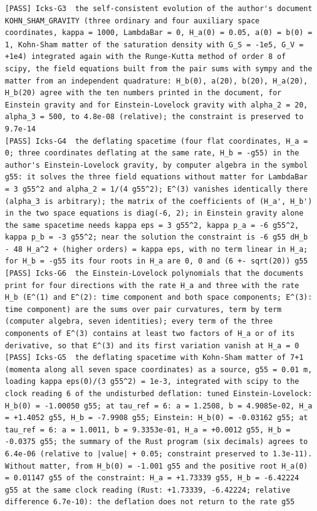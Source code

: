 \documentclass[
  10pt,
]{article}
\begin{document}
\begin{verbatim}
[PASS] Icks-G3  the self-consistent evolution of the author's document KOHN_SHAM_GRAVITY (three ordinary and four auxiliary space coordinates, kappa = 1000, LambdaBar = 0, H_a(0) = 0.05, a(0) = b(0) = 1, Kohn-Sham matter of the saturation density with G_S = -1e5, G_V = +1e4) integrated again with the Runge-Kutta method of order 8 of scipy, the field equations built from the pair sums with sympy and the matter from an independent quadrature: H_b(0), a(20), b(20), H_a(20), H_b(20) agree with the ten numbers printed in the document, for Einstein gravity and for Einstein-Lovelock gravity with alpha_2 = 20, alpha_3 = 500, to 4.8e-08 (relative); the constraint is preserved to 9.7e-14
[PASS] Icks-G4  the deflating spacetime (four flat coordinates, H_a = 0; three coordinates deflating at the same rate, H_b = -g55) in the author's Einstein-Lovelock gravity, by computer algebra in the symbol g55: it solves the three field equations without matter for LambdaBar = 3 g55^2 and alpha_2 = 1/(4 g55^2); E^(3) vanishes identically there (alpha_3 is arbitrary); the matrix of the coefficients of (H_a', H_b') in the two space equations is diag(-6, 2); in Einstein gravity alone the same spacetime needs kappa eps = 3 g55^2, kappa p_a = -6 g55^2, kappa p_b = -3 g55^2; near the solution the constraint is -6 g55 dH_b - 48 H_a^2 + (higher orders) = kappa eps, with no term linear in H_a; for H_b = -g55 its four roots in H_a are 0, 0 and (6 +- sqrt(20)) g55
[PASS] Icks-G6  the Einstein-Lovelock polynomials that the documents print for four directions with the rate H_a and three with the rate H_b (E^(1) and E^(2): time component and both space components; E^(3): time component) are the sums over pair curvatures, term by term (computer algebra, seven identities); every term of the three components of E^(3) contains at least two factors of H_a or of its derivative, so that E^(3) and its first variation vanish at H_a = 0
[PASS] Icks-G5  the deflating spacetime with Kohn-Sham matter of 7+1 (momenta along all seven space coordinates) as a source, g55 = 0.01 m, loading kappa eps(0)/(3 g55^2) = 1e-3, integrated with scipy to the clock reading 6 of the undisturbed deflation: tuned Einstein-Lovelock: H_b(0) = -1.00050 g55; at tau_ref = 6: a = 1.2508, b = 4.9085e-02, H_a = +1.4052 g55, H_b = -7.9908 g55; Einstein: H_b(0) = -0.03162 g55; at tau_ref = 6: a = 1.0011, b = 9.3353e-01, H_a = +0.0012 g55, H_b = -0.0375 g55; the summary of the Rust program (six decimals) agrees to 6.4e-06 (relative to |value| + 0.05; constraint preserved to 1.3e-11). Without matter, from H_b(0) = -1.001 g55 and the positive root H_a(0) = 0.01147 g55 of the constraint: H_a = +1.73339 g55, H_b = -6.42224 g55 at the same clock reading (Rust: +1.73339, -6.42224; relative difference 6.7e-10): the deflation does not return to the rate g55

\end{verbatim}
\end{document}
